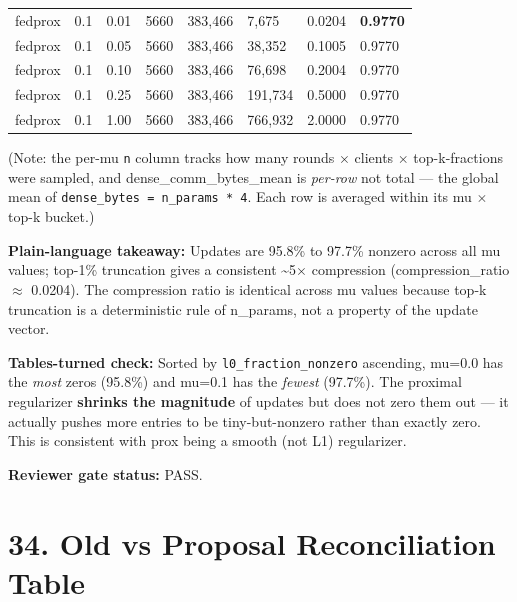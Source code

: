 \documentclass{article}
\begin{document}
\begin{table}[H]
{\begin{tabular}{llllllll}
    fedprox & 0.1 & 0.01 & 5660 & 383,466 & 7,675 & 0.0204 & \textbf{0.9770} \\
    fedprox & 0.1 & 0.05 & 5660 & 383,466 & 38,352 & 0.1005 & 0.9770 \\
    fedprox & 0.1 & 0.10 & 5660 & 383,466 & 76,698 & 0.2004 & 0.9770 \\
    fedprox & 0.1 & 0.25 & 5660 & 383,466 & 191,734 & 0.5000 & 0.9770 \\
    fedprox & 0.1 & 1.00 & 5660 & 383,466 & 766,932 & 2.0000 & 0.9770 \\
    \bottomrule
  \end{tabular}
  }
\end{table}


(Note: the per-mu \texttt{n} column tracks how many rounds \ensuremath{\times} clients \ensuremath{\times} top-k-fractions were sampled, and dense\_comm\_bytes\_mean is \emph{per-row} not total --- the global mean of \texttt{dense\_bytes = n\_params * 4}. Each row is averaged within its mu \ensuremath{\times} top-k bucket.)


\textbf{Plain-language takeaway:} Updates are 95.8\% to 97.7\% nonzero across all mu values; top-1\% truncation gives a consistent \textasciitilde{}5\ensuremath{\times} compression (compression\_ratio \ensuremath{\approx} 0.0204). The compression ratio is identical across mu values because top-k truncation is a deterministic rule of n\_params, not a property of the update vector.


\textbf{Tables-turned check:} Sorted by \texttt{l0\_fraction\_nonzero} ascending, mu=0.0 has the \emph{most} zeros (95.8\%) and mu=0.1 has the \emph{fewest} (97.7\%). The proximal regularizer \textbf{shrinks the magnitude} of updates but does not zero them out --- it actually pushes more entries to be tiny-but-nonzero rather than exactly zero. This is consistent with prox being a smooth (not L1) regularizer.


\textbf{Reviewer gate status:} PASS.



\clearpage
\section{34. Old vs Proposal Reconciliation Table}
\end{document}
